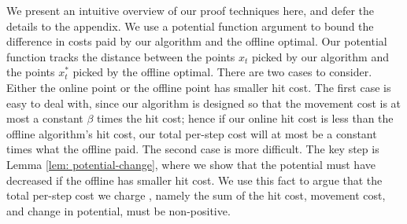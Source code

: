 We present an intuitive overview of our proof techniques here, and defer the details to the appendix. We use a potential function argument to bound the difference in costs paid by our algorithm and the offline optimal.  Our potential function tracks the distance between the points $x_t$ picked by our algorithm and the points $x_t^*$ picked by the offline optimal. 
There are two cases to consider. Either the online point or the offline point has smaller hit cost. The first case is easy to deal with, since our algorithm is designed so that the movement cost is at most a constant $\beta$ times the hit cost; hence if our online hit cost is less than the offline algorithm's hit cost, our total per-step cost will at most be a constant times what the offline paid. The second case is more difficult. The key step is Lemma  \ref{lem: potential-change}, where we show that the potential must have decreased if the offline has smaller hit cost. We use this fact to argue that the total per-step cost we charge \ouralg, namely the sum of the hit cost, movement cost, and change in potential, must be non-positive. 



